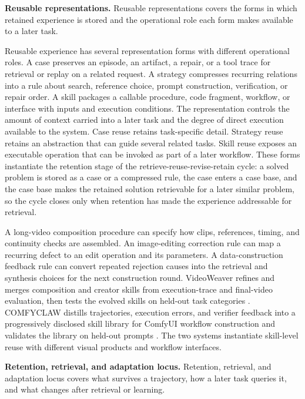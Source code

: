 \textbf{Reusable representations.} Reusable representations covers the forms in which retained experience is stored and the operational role each form makes available to a later task.

Reusable experience has several representation forms with different operational roles. A case preserves an episode, an artifact, a repair, or a tool trace for retrieval or replay on a related request. A strategy compresses recurring relations into a rule about search, reference choice, prompt construction, verification, or repair order. A skill packages a callable procedure, code fragment, workflow, or interface with inputs and execution conditions. The representation controls the amount of context carried into a later task and the degree of direct execution available to the system. Case reuse retains task-specific detail. Strategy reuse retains an abstraction that can guide several related tasks. Skill reuse exposes an executable operation that can be invoked as part of a later workflow. These forms instantiate the retention stage of the retrieve-reuse-revise-retain cycle: a solved problem is stored as a case or a compressed rule, the case enters a case base, and the case base makes the retained solution retrievable for a later similar problem, so the cycle closes only when retention has made the experience addressable for retrieval.

A long-video composition procedure can specify how clips, references, timing, and continuity checks are assembled. An image-editing correction rule can map a recurring defect to an edit operation and its parameters. A data-construction feedback rule can convert repeated rejection causes into the retrieval and synthesis choices for the next construction round. VideoWeaver refines and merges composition and creator skills from execution-trace and final-video evaluation, then tests the evolved skills on held-out task categories \cite{avg260608091}. COMFYCLAW distills trajectories, execution errors, and verifier feedback into a progressively disclosed skill library for ComfyUI workflow construction and validates the library on held-out prompts \cite{avg260701709}. The two systems instantiate skill-level reuse with different visual products and workflow interfaces.

\textbf{Retention, retrieval, and adaptation locus.} Retention, retrieval, and adaptation locus covers what survives a trajectory, how a later task queries it, and what changes after retrieval or learning.

